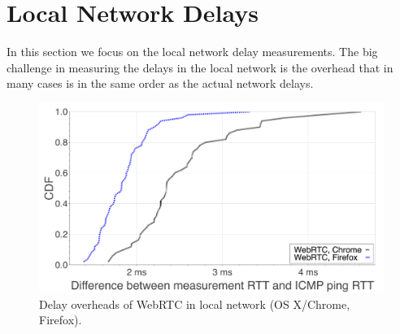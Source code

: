 \documentclass[12pt,twoside]{book}
\begin{document}
%
%
%
%

\section{Local Network Delays}
\label{sec:local}

In this section we focus on the local network delay measurements. The big challenge in measuring the delays in the local network is the overhead that in many cases is in the same order as the actual network delays.

\begin{figure}[thb]
\includegraphics[width=\columnwidth]{figures/other-machine-comp-chrome-ff}
\caption{Delay overheads of WebRTC in local network (OS X/Chrome, Firefox).}
\label{fig:peer_comp_chrome_ff}
\end{figure}
\end{document}
